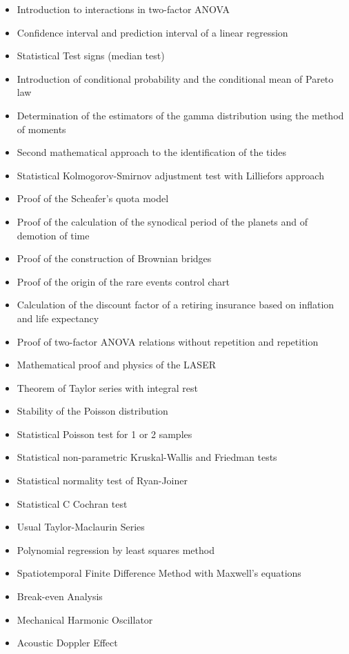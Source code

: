\documentclass[12pt,a4paper,twoside,openright]{report}
\theoremstyle{definition}
\theoremstyle{itexmp}
\numberwithin{equation}{section}
\begin{document}
\begin{itemize}
\begin{itemize}[noitemsep]
				\item Introduction to interactions in two-factor ANOVA
				\item Confidence interval and prediction interval of a linear regression
				\item Statistical Test signs (median test)
				\item Introduction of conditional probability and the conditional mean of Pareto law
				\item Determination of the estimators of the gamma distribution using the method of moments
				\item Second mathematical approach to the identification of the tides
				\item Statistical Kolmogorov-Smirnov adjustment test with Lilliefors approach
				\item Proof of the Scheafer's quota model
				\item Proof of the calculation of the synodical period of the planets and of demotion of time
				\item Proof of the construction of Brownian bridges
				\item Proof of the origin of the rare events control chart
				\item Calculation of the discount factor of a retiring insurance based on inflation and life expectancy
				\item Proof of two-factor ANOVA relations without repetition and repetition
				\item Mathematical proof and physics of the LASER
				\item Theorem of Taylor series with integral rest
				\item Stability of the Poisson distribution
				\item Statistical Poisson test for 1 or 2 samples
				\item Statistical non-parametric Kruskal-Wallis and Friedman tests
				\item Statistical normality test of Ryan-Joiner
				\item Statistical C Cochran test
				\item Usual Taylor-Maclaurin Series
				\item Polynomial regression by least squares method
				\item Spatiotemporal Finite Difference Method with Maxwell's equations
				\item Break-even Analysis
				\item Mechanical Harmonic Oscillator
				\item Acoustic Doppler Effect

\end{itemize}
\end{itemize}
\end{document}
